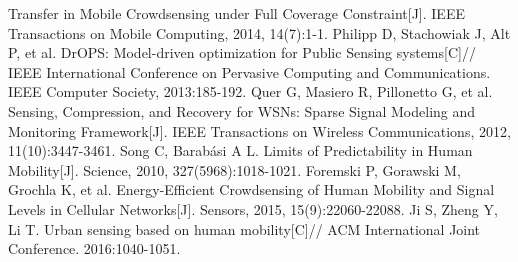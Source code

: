 \documentclass[UTF8]{ctexart}
\begin{document}
\begin{thebibliography}{99}
  Transfer in Mobile Crowdsensing under Full Coverage Constraint[J]. IEEE
  Transactions on Mobile Computing, 2014, 14(7):1-1.
   Philipp D, Stachowiak J, Alt P, et al. DrOPS: Model-driven
  optimization for Public Sensing systems[C]// IEEE International Conference on
  Pervasive Computing and Communications. IEEE Computer Society, 2013:185-192.
   Quer G, Masiero R, Pillonetto G, et al. Sensing, Compression, and
  Recovery for WSNs: Sparse Signal Modeling and Monitoring Framework[J]. IEEE
  Transactions on Wireless Communications, 2012, 11(10):3447-3461.
   Song C, Barabási A L. Limits of Predictability in Human
  Mobility[J]. Science, 2010, 327(5968):1018-1021.
   Foremski P, Gorawski M, Grochla K, et al. Energy-Efficient
  Crowdsensing of Human Mobility and Signal Levels in Cellular Networks[J].
  Sensors, 2015, 15(9):22060-22088.
   Ji S, Zheng Y, Li T. Urban sensing based on human mobility[C]//
  ACM International Joint Conference. 2016:1040-1051.

\end{thebibliography}
\end{document}
